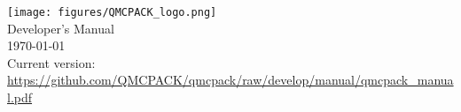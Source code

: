 
\begin{titlepage}
\vspace*{\fill}
\begin{center}

\texttt{[image: figures/QMCPACK\_logo.png]} \\
{\huge Developer's Manual\\}
{
\huge %
\today}\\
{\small Current version: \url{https://github.com/QMCPACK/qmcpack/raw/develop/manual/qmcpack_manual.pdf}}
\end{center}
\vspace*{\fill}
\end{titlepage}
